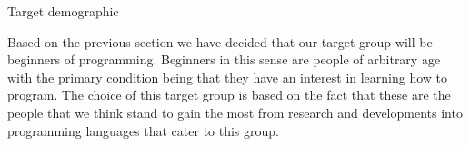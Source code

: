 Target demographic

Based on the previous section we have decided that our target group will be beginners of programming. Beginners in this sense are people of arbitrary age with the primary condition being that they have an interest in learning how to program.
The choice of this target group is based on the fact that these are the people that we think stand to gain the most from research and developments into programming languages that cater to this group. 
